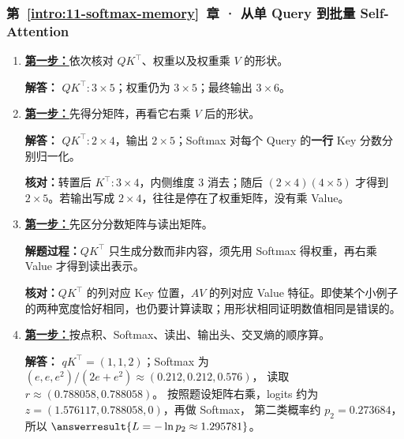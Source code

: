 \subsubsection*{第~\ref*{intro:11-softmax-memory}~章 · 从单 Query 到批量 Self-Attention}
\begin{enumerate}[label={},leftmargin=4.8em,itemsep=4pt]
\item[\textbf{C-060.}] \leavevmode{}\label{solution:C-060}\label{solution:attention-shapes}\hyperref[exercise:attention-shapes]{\textbf{第一步：}}依次核对 $QK^\top$、权重以及权重乘 $V$ 的形状。\par\nobreak
\textbf{解答：} $QK^\top:3\times5$；权重仍为 $3\times5$；最终输出 $3\times6$。
\item[\textbf{C-061.}] \leavevmode{}\label{solution:C-061}\label{solution:cross-attention-shapes}\hyperref[exercise:cross-attention-shapes]{\textbf{第一步：}}先得分矩阵，再看它右乘 $V$ 后的形状。\par\nobreak
\textbf{解答：} $QK^\top:2\times4$，输出 $2\times5$；Softmax 对每个 Query 的\textbf{一行} Key 分数分别归一化。\par\textbf{核对：}转置后 $K^\top:3\times4$，内侧维度 $3$ 消去；随后 $(2\times4)(4\times5)$ 才得到 $2\times5$。若输出写成 $2\times4$，往往是停在了权重矩阵，没有乘 Value。
\item[\textbf{C-062.}] \leavevmode{}\label{solution:C-062}\label{solution:score-value-confusion}\hyperref[exercise:score-value-confusion]{\textbf{第一步：}}先区分分数矩阵与读出矩阵。\par\nobreak\textbf{解题过程：}$QK^\top$ 只生成分数而非内容，须先用 Softmax 得权重，再右乘 Value 才得到读出表示。\par\textbf{核对：}$QK^\top$ 的列对应 Key 位置，$AV$ 的列对应 Value 特征。即使某个小例子的两种宽度恰好相同，也仍要计算读取；用形状相同证明数值相同是错误的。
\item[\textbf{C-063.}] \leavevmode{}\label{solution:C-063}\label{solution:attention-loss-transfer}\hyperref[exercise:attention-loss-transfer]{\textbf{第一步：}}按点积、Softmax、读出、输出头、交叉熵的顺序算。\par\nobreak
\textbf{解答：} $qK^\top=(1,1,2)$；Softmax 为
$(e,e,e^2)/(2e+e^2)\approx(0.212,0.212,0.576)$，
读取 $r\approx(0.788058,0.788058)$。
按照题设矩阵右乘，logits 约为
$z=(1.576117,0.788058,0)$，再做 Softmax，
第二类概率约 $p_2=0.273684$，所以
$\answerresult{L=-\ln p_2\approx1.295781}$。

\end{enumerate}
